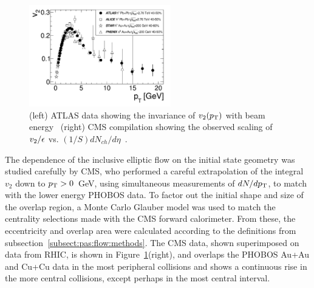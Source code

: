 \begin{figure}[!tb]
\begin{center}
\includegraphics[width=0.55\textwidth]{flowcorrelations_figs/atlas_v2_fig_06.pdf}
\caption[]{(left) ATLAS data showing the invariance of $\mbox{$v_2$}( \mbox{$p_{\mathrm{T}}$} )$
  with beam energy~\cite{ATLAS:2011ah} (right) CMS compilation showing
  the observed scaling of $\mbox{$v_2$} /\epsilon$ vs. $(1/S)
  dN_{ch}/d\eta$~\cite{Chatrchyan:2012ta}.}
\label{fig:pas:fc:scaling}
\end{center}
\end{figure}
The dependence of the inclusive elliptic flow on the initial state geometry was studied carefully by CMS, who
performed a careful extrapolation of the integral $v_2$ down to $\mbox{$p_{\mathrm{T}}$}>0$~GeV, using simultaneous measurements of
$dN/d\mbox{$p_{\mathrm{T}}$}$, to match with the lower energy PHOBOS data.
To factor out the initial shape and size of the overlap region, a Monte Carlo Glauber model was used to match
the centrality selections made with the CMS forward calorimeter.
From these, the eccentricity and overlap area were calculated according to the definitions from
subsection~\ref{subsect:pas:flow:methods}.  The CMS data, shown superimposed on data from RHIC, is shown in
Figure~\ref{fig:pas:fc:scaling}(right), and overlaps the PHOBOS Au+Au and
Cu+Cu data in the most peripheral collisions and
shows a continuous rise in the more central collisions, except perhaps in the most central interval.

